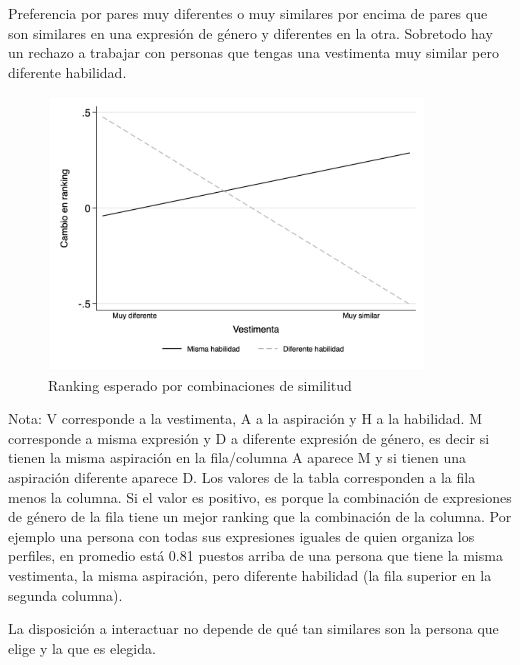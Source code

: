 Preferencia por pares muy diferentes o muy similares por encima de pares que son similares en una expresión de género y diferentes en la otra. Sobretodo hay un rechazo a trabajar con personas que tengas una vestimenta muy similar pero diferente habilidad. 

\begin{figure}[htbp]
    \centering
    \includegraphics[width=10cm]{Images/h3_predicted_rank_score.png}
    \caption{Ranking esperado por combinaciones de similitud}
    \label{fig:H4}
\end{figure}

\begin{table}
    \centering
    \caption{Diferencia en ranking por similitud en expresiones de género}
    \label{tab:H4}
    \begin{threeparttable} \fontsize{9.5}{12}
    \begin{tablenotes}
    \scriptsize{
    \item Nota: V corresponde a la vestimenta, A a la aspiración y H a la habilidad. M corresponde a misma expresión y D a diferente expresión de género, es decir si tienen la misma aspiración en la fila/columna A aparece M y si tienen una aspiración diferente aparece D. Los valores de la tabla corresponden a la fila menos la columna. Si el valor es positivo, es porque la combinación de expresiones de género de la fila tiene un mejor ranking que la combinación de la columna. Por ejemplo una persona con todas sus expresiones iguales de quien organiza los perfiles, en promedio está 0.81 puestos arriba de una persona que tiene la misma vestimenta, la misma aspiración, pero diferente habilidad (la fila superior en la segunda columna).}
    \end{tablenotes}
    \end{threeparttable}
\end{table}


\begin{result}
La disposición a interactuar no depende de qué tan similares son la persona que elige y la que es elegida. 
\end{result}


